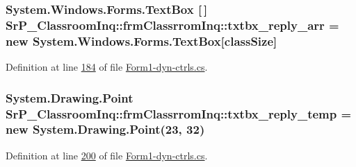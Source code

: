 \hypertarget{class_sr_p___classroom_inq_1_1frm_classrrom_inq_a3411157caafbe33c31a364fafd548afb}{
\subsubsection[{txtbx\-\_\-reply\-\_\-arr}]{\setlength{\rightskip}{0pt plus 5cm}\-System.\-Windows.\-Forms.\-Text\-Box \mbox{[}$\,$\mbox{]} {\bf \-Sr\-P\-\_\-\-Classroom\-Inq\-::frm\-Classrrom\-Inq\-::txtbx\-\_\-reply\-\_\-arr} = new \-System.\-Windows.\-Forms.\-Text\-Box\mbox{[}{\bf class\-Size}\mbox{]}}}
\label{class_sr_p___classroom_inq_1_1frm_classrrom_inq_a3411157caafbe33c31a364fafd548afb}


\-Definition at line \hyperlink{_form1-dyn-ctrls_8cs_source_l00184}{184} of file \hyperlink{_form1-dyn-ctrls_8cs_source}{\-Form1-\/dyn-\/ctrls.\-cs}.

\hypertarget{class_sr_p___classroom_inq_1_1frm_classrrom_inq_a0b175596cb83997b38795ee916c978f1}{
\subsubsection[{txtbx\-\_\-reply\-\_\-temp}]{\setlength{\rightskip}{0pt plus 5cm}\-System.\-Drawing.\-Point {\bf \-Sr\-P\-\_\-\-Classroom\-Inq\-::frm\-Classrrom\-Inq\-::txtbx\-\_\-reply\-\_\-temp} = new \-System.\-Drawing.\-Point(23, 32)}}
\label{class_sr_p___classroom_inq_1_1frm_classrrom_inq_a0b175596cb83997b38795ee916c978f1}


\-Definition at line \hyperlink{_form1-dyn-ctrls_8cs_source_l00200}{200} of file \hyperlink{_form1-dyn-ctrls_8cs_source}{\-Form1-\/dyn-\/ctrls.\-cs}.

